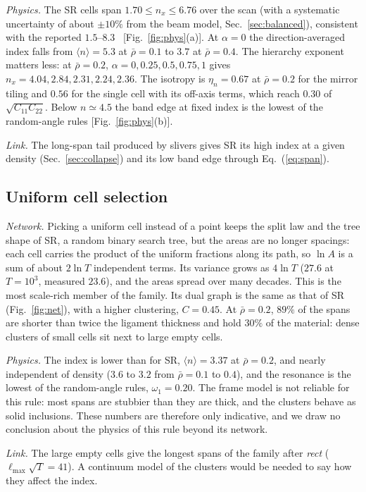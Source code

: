 \documentclass[aps,pre,twocolumn,superscriptaddress,amsmath,amssymb,floatfix]{revtex4-2}
\begin{document}
\emph{Physics.} The SR cells span $1.70\le n_x\le6.76$ over the scan (with a systematic
uncertainty of about $\pm10\%$ from the beam model, Sec.~\ref{sec:balanced}), consistent
with the reported $1.5$--$8.3$~\cite{both2026} [Fig.~\ref{fig:phys}(a)]. At $\alpha=0$ the
direction-averaged index falls from $\langle n\rangle=5.3$ at $\bar\rho=0.1$ to $3.7$ at
$\bar\rho=0.4$. The hierarchy exponent matters less: at $\bar\rho=0.2$,
$\alpha=0,0.25,0.5,0.75,1$ gives $n_x=4.04,2.84,2.31,2.24,2.36$. The isotropy is
$\eta_n=0.67$ at $\bar\rho=0.2$ for the mirror tiling and $0.56$ for the single cell with
its off-axis terms, which reach $0.30$ of $\sqrt{C_{11}C_{22}}$. Below $n\simeq4.5$ the band
edge at fixed index is the lowest of the random-angle rules [Fig.~\ref{fig:phys}(b)].

\emph{Link.} The long-span tail produced by slivers gives SR its high index at a given
density (Sec.~\ref{sec:collapse}) and its low band edge through Eq.~(\ref{eq:span}).

\subsection{Uniform cell selection}
\emph{Network.} Picking a uniform cell instead of a point keeps the split law and the
tree shape of SR, a random binary search tree, but the areas are no longer spacings:
each cell carries the product of the uniform fractions along its path, so $\ln A$ is a
sum of about $2\ln T$ independent terms. Its variance grows as $4\ln T$ ($27.6$ at
$T=10^3$, measured $23.6$), and the areas spread over many decades. This is the most
scale-rich member of the family. Its dual graph is the same as that of SR
(Fig.~\ref{fig:net}), with a higher clustering, $C=0.45$. At $\bar\rho=0.2$, $89\%$ of the spans
are shorter than twice the ligament thickness and hold $30\%$ of the material: dense
clusters of small cells sit next to large empty cells.

\emph{Physics.} The index is lower than for SR, $\langle n\rangle=3.37$ at $\bar\rho=0.2$,
and nearly independent of density ($3.6$ to $3.2$ from $\bar\rho=0.1$ to $0.4$), and the
resonance is the lowest of the random-angle rules, $\omega_1=0.20$. The frame model is
not reliable for this rule: most spans are stubbier than they are thick, and the clusters
behave as solid inclusions. These numbers are therefore only indicative, and we draw no
conclusion about the physics of this rule beyond its network.

\emph{Link.} The large empty cells give the longest spans of the family after
\emph{rect} ($\ell_{\max}\sqrt T=41$). A continuum model of the clusters would be needed to
say how they affect the index.
\end{document}
